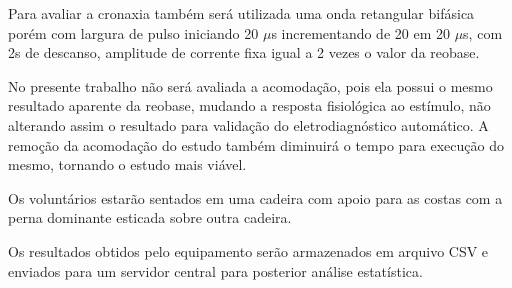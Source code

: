 Para avaliar a cronaxia também será utilizada uma onda retangular bifásica porém com largura de pulso iniciando 20 $\mu$s incrementando de 20 em 20 $\mu$s, com 2s de descanso, amplitude de corrente fixa igual a 2 vezes o valor da reobase.

No presente trabalho não será avaliada a acomodação, pois ela possui o mesmo resultado aparente da reobase, mudando a resposta fisiológica ao estímulo, não alterando assim o resultado para validação do eletrodiagnóstico automático. A remoção da acomodação do estudo também diminuirá o tempo para execução do mesmo, tornando o estudo mais viável.

Os voluntários estarão sentados em uma cadeira com apoio para as costas com a perna dominante esticada sobre outra cadeira.

Os resultados obtidos pelo equipamento serão armazenados em arquivo CSV e enviados para um servidor central para posterior análise estatística.